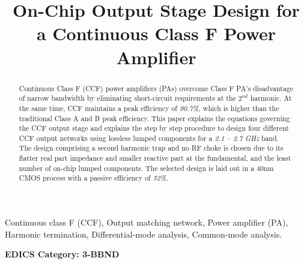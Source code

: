\documentclass[conference]{IEEEtran}
\begin{document}
\title{On-Chip Output Stage Design for a  Continuous Class F Power Amplifier}

\author{ 
}

\maketitle

\begin{abstract}
Continuous Class F (CCF) power amplifiers (PAs) overcome Class F PA's disadvantage of narrow bandwidth by eliminating short-circuit requirements at the $2^{nd}$ harmonic. At the same time, CCF maintains a peak efficiency of \textit{90.7\%}, which is higher than the traditional Class A and B peak efficiency. This paper explains the equations governing the CCF output stage and explains the step by step procedure to design four different CCF output networks using lossless lumped components for a \textit{2.1 -- 2.7 GHz} band. The design comprising a second harmonic trap and no RF choke is chosen due to its  flatter real part impedance and smaller reactive part at the fundamental, and  the least number of on-chip lumped components. The selected design is laid out in a 40nm CMOS process with a passive efficiency of \textit{52\%}.
\end{abstract}

\vspace{1mm}
\begin{IEEEkeywords}
Continuous class F (CCF), Output matching network, Power amplifier (PA), Harmonic termination, Differential-mode analysis, Common-mode analysis. 
\end{IEEEkeywords}


\ifCLASSOPTIONpeerreview
\begin{center} \bfseries EDICS Category: 3-BBND \end{center}
\fi

\IEEEpeerreviewmaketitle
\end{document}
